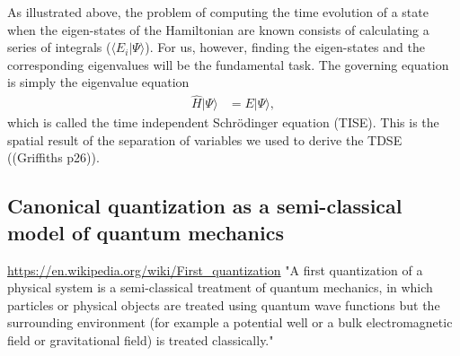 \documentclass[a4paper]{article}
\newcommand{\der} [2]{\frac{\mathrm{d} #1}{\mathrm{d} #2}}   %
\newcommand{\R}{\mathbb{R}}
\begin{document}
As illustrated above, the problem of computing the time evolution of a state when the eigen-states of the Hamiltonian are known consists of calculating a series of integrals ($\langle E_i|\Psi\rangle$). For us, however, finding the eigen-states and the corresponding eigenvalues will be the fundamental task. The governing equation is simply the eigenvalue equation 
\begin{align}
\hat H |\Psi\rangle &= E |\Psi\rangle, \label{eq:TISE}
\end{align}
which is called the time independent Schrödinger equation (TISE). This is the spatial result of the separation of variables we used to derive the TDSE ((Griffiths p26)). 

\subsection{Canonical quantization as a semi-classical model of quantum mechanics}
\url{https://en.wikipedia.org/wiki/First_quantization} "A first quantization of a physical system is a semi-classical treatment of quantum mechanics, in which particles or physical objects are treated using quantum wave functions but the surrounding environment (for example a potential well or a bulk electromagnetic field or gravitational field) is treated classically."


\end{document}

